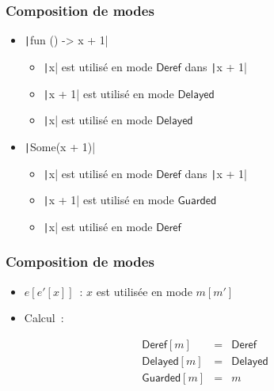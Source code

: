\documentclass{beamer}
\newcommand{\Deref}{\mathsf{Deref}}
\newcommand{\Guarded}{\mathsf{Guarded}}
\newcommand{\Delayed}{\mathsf{Delayed}}
\begin{document}
\begin{frame}
  \frametitle{Composition de modes}
  \begin{itemize}

    \item<1-> \texttt|fun () -> x + 1|
      \begin{itemize}
        \item<2-> \texttt|x| est utilisé en mode $\Deref$ dans
          \texttt|x + 1|
        \item<3-> \texttt|x + 1| est utilisé en mode $\Delayed$
        \item<4-> \texttt|x| est utilisé en mode $\Delayed$
      \end{itemize}

    \item<5-> \texttt|Some(x + 1)|
      \begin{itemize}
        \item<6-> \texttt|x| est utilisé en mode $\Deref$ dans
          \texttt|x + 1|
        \item<7-> \texttt|x + 1| est utilisé en mode $\Guarded$
        \item<8-> \texttt|x| est utilisé en mode $\Deref$
      \end{itemize}

  \end{itemize}
\end{frame}

\begin{frame}
  \frametitle{Composition de modes}

  \begin{itemize}
    \item $e[e'[x]]$ : $x$ est utilisée en mode $m[m']$
    \item Calcul :
  \end{itemize}

  \begin{displaymath}
    \begin{array}{lll}
      \Deref [m] & = & \Deref \\
      \Delayed [m] & = & \Delayed \\
      \Guarded [m] & = & m \\
    \end{array}
  \end{displaymath}
\end{frame}
\end{document}
